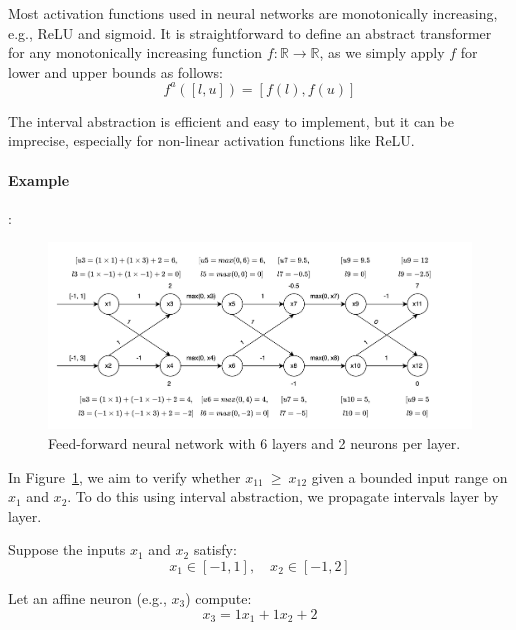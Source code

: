 \documentclass[oneside,11pt,dvipsnames]{book}
\begin{document}
Most activation functions used in neural networks are monotonically increasing, e.g., ReLU and sigmoid. It is straightforward to define
an abstract transformer for any monotonically increasing function \(f : \mathbb{R} \to \mathbb{R}\), as we simply apply \(f\) for lower and upper bounds as follows:
\[f^a
([l, u]) = [ f(l), f(u)]
\]

The interval abstraction is efficient and easy to implement, but it can be imprecise, especially for non-linear activation functions like ReLU. 

\paragraph{Example}: 


\begin{figure}[h]
    \centering
    \includegraphics[width=1.2\linewidth]{2_layers_example.png}
    \caption{Feed-forward neural network with 6 layers and 2 neurons per layer.}
    \label{fig:interval-network}
\end{figure}
In Figure~\ref{fig:interval-network}, we aim to verify whether \(x_{11}\ \geq\ x_{12}\) given a bounded input range on \(x_1\) and \(x_2\). To do this using interval abstraction, we propagate intervals layer by layer.

Suppose the inputs \(x_1\) and \(x_2\) satisfy:
\[
x_1 \in [-1, 1], \quad x_2 \in [-1, 2]
\]

Let an affine neuron (e.g., \(x_3\)) compute:
\[
x_3 = 1 x_1 + 1 x_2 + 2
\]
\end{document}
